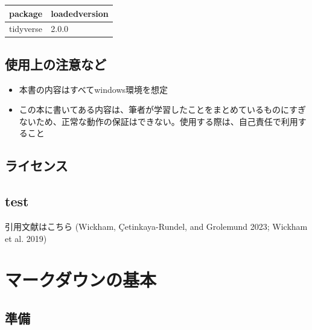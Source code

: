 \documentclass[
  b5paper,
  xelatex, ja=standard]{bxjsbook}
\begin{document}
\begin{table}
\centering
\begin{tabular}{l|l}
\hline
package & loadedversion\\
\hline
tidyverse & 2.0.0\\
\hline
\end{tabular}
\end{table}

\section*{使用上の注意など}\label{ux4f7fux7528ux4e0aux306eux6ce8ux610fux306aux3069}


\begin{itemize}
\item
  本書の内容はすべてwindows環境を想定
\item
  この本に書いてある内容は、筆者が学習したことをまとめているものにすぎないため、正常な動作の保証はできない。使用する際は、自己責任で利用すること
\end{itemize}

\section*{ライセンス}\label{ux30e9ux30a4ux30bbux30f3ux30b9}


\section*{test}\label{test}


引用文献はこちら (Wickham, Çetinkaya-Rundel, and Grolemund 2023; Wickham
et al. 2019)


\chapter{マークダウンの基本}\label{sec-basic}

\section{準備}\label{ux6e96ux5099}
\end{document}
